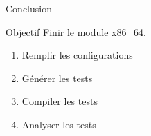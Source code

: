 \documentclass[A4,svgnames,9pt,aspectratio=169]{beamer}
\begin{document}
\begin{frame}{Conclusion}
  \begin{block}{Objectif}
    Finir le module x86\_64.
  \end{block}

  \begin{enumerate}
    \item Remplir les configurations
    \item Générer les tests
    \item[{\makebox[0pt][l]{$\square$}\raisebox{.15ex}{\hspace{0.1em}$\checkmark$}}] \sout{Compiler les tests}
    \item[{\makebox[0pt][l]{$\square$}\raisebox{.15ex}{\hspace{0.1em}$\checkmark$}}] Analyser les tests
  \end{enumerate}
  

\end{frame}


\frame{\merci}
\end{document}
